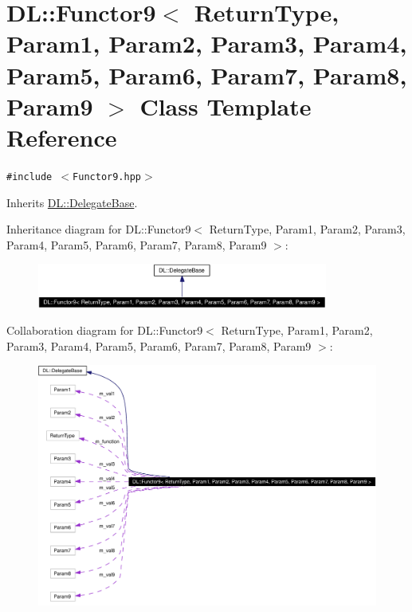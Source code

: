 \hypertarget{classDL_1_1Functor9}{
\section{DL::Functor9$<$ Return\-Type, Param1, Param2, Param3, Param4, Param5, Param6, Param7, Param8, Param9 $>$ Class Template Reference}
\label{classDL_1_1Functor9}
}
{\tt \#include $<$Functor9.hpp$>$}

Inherits \hyperlink{classDL_1_1DelegateBase}{DL::Delegate\-Base}.

Inheritance diagram for DL::Functor9$<$ Return\-Type, Param1, Param2, Param3, Param4, Param5, Param6, Param7, Param8, Param9 $>$:\begin{figure}[H]
\begin{center}
\leavevmode
\includegraphics[width=271pt]{classDL_1_1Functor9__inherit__graph}
\end{center}
\end{figure}
Collaboration diagram for DL::Functor9$<$ Return\-Type, Param1, Param2, Param3, Param4, Param5, Param6, Param7, Param8, Param9 $>$:\begin{figure}[H]
\begin{center}
\leavevmode
\includegraphics[width=363pt]{classDL_1_1Functor9__coll__graph}
\end{center}
\end{figure}
